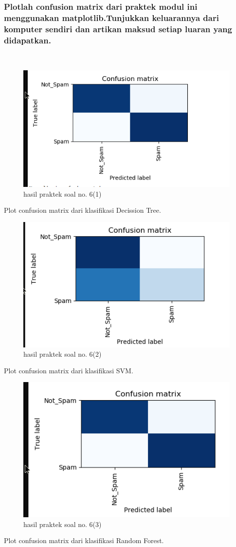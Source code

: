 \subsubsection{Plotlah confusion matrix dari praktek modul ini menggunakan matplotlib.Tunjukkan keluarannya dari komputer sendiri dan artikan maksud setiap luaran yang didapatkan.}
\hfill\\

	\begin{figure}[H]
	\centering
		\includegraphics[width=8 cm]{figures/1174067/4/13.png}
	\caption{hasil praktek soal no. 6(1)}
	\end{figure}
	Plot confusion matrix dari klasifikasi Decission Tree.

	\begin{figure}[H]
	\centering
		\includegraphics[width=8 cm]{figures/1174067/4/14.png}
	\caption{hasil praktek soal no. 6(2)}
	\end{figure}
	Plot confusion matrix dari klasifikasi SVM.

	\begin{figure}[H]
	\centering
		\includegraphics[width=8 cm]{figures/1174067/4/15.png}
	\caption{hasil praktek soal no. 6(3)}
	\end{figure}
	Plot confusion matrix dari klasifikasi Random Forest.
	
